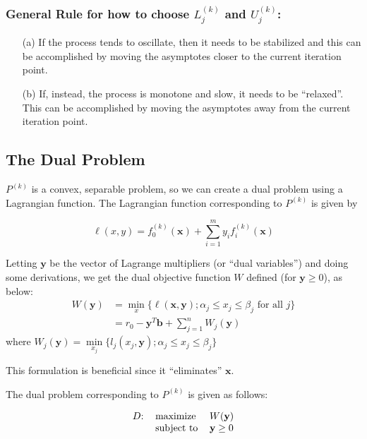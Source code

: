 \subsubsection*{General Rule for how to choose $L_j^{(k)}$ and $U_j^{(k)}$:}
\begin{itemize}
	\item[(a)] If the process tends to oscillate, then it needs to be stabilized and this can be accomplished by moving the asymptotes closer to the current iteration point.
	\item[(b)] If, instead, the process is monotone and slow, it needs to be ``relaxed''. This can be accomplished by moving the asymptotes away from the current iteration point.
\end{itemize}

\subsection{The Dual Problem}

$P^{(k)}$ is a convex, separable problem, so we can create a dual problem using a Lagrangian function. The Lagrangian function corresponding to $P^{(k)}$ is given by 

$$\ell(x,y)=f_0^{(k)}(\mathbf{x})+\sum\limits_{i=1}^{m}y_if_i^{(k)}(\mathbf{x})$$

Letting $\mathbf{y}$ be the vector of Lagrange multipliers (or ``dual variables'') and doing some derivations, we get the dual objective function $W$ defined (for $\mathbf{y}\geq 0$), as below:
\begin{align*}
	W(\mathbf{y}) & =\min\limits_x\lbrace\ell(\mathbf{x},\mathbf{y}); \alpha_j\leq x_j\leq \beta_j\text{ for all }j\rbrace \\
	           & =r_0-\mathbf{y}^T\mathbf{b}+\sum\limits_{j=1}^{n}W_j(\mathbf{y})                                          
\end{align*}
where $W_j(\mathbf{y})=\min\limits_{x_j}\lbrace l_j(x_j,\mathbf{y}); \alpha_j\leq x_j\leq \beta_j\rbrace$

This formulation is beneficial since it ``eliminates'' $\mathbf{x}$.

The dual problem corresponding to $P^{(k)}$ is given as follows:

\begin{equation}
	\begin{tabular}{lll}
		$D$: & maximize   & $W(\mathbf{y})$    \\
		     & subject to & $\mathbf{y}\geq 0$
	\end{tabular}
\end{equation}
                                     
